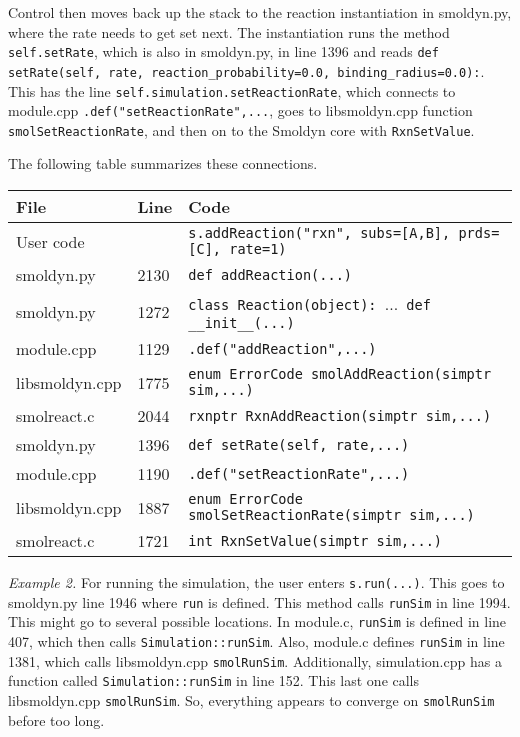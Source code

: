 \documentclass {scrbook}
\newcommand {\ttt} {\texttt}
\begin{document}
Control then moves back up the stack to the reaction instantiation in smoldyn.py, where the rate needs to get set next. The instantiation runs the method \ttt{self.setRate}, which is also in smoldyn.py, in line 1396 and reads \ttt{def setRate(self, rate, reaction\_probability=0.0, binding\_radius=0.0):}. This has the line \ttt{self.simulation.setReactionRate}, which connects to module.cpp \ttt{.def("setReactionRate",...}, goes to libsmoldyn.cpp function \ttt{smolSetReactionRate}, and then on to the Smoldyn core with \ttt{RxnSetValue}.

The following table summarizes these connections.

\begin{longtable}[c]{lll}
File & Line & Code \\
\hline
User code & &\ttt{s.addReaction("rxn", subs=[A,B], prds=[C], rate=1)} \\
smoldyn.py & 2130 & \hspace{0.2cm} \ttt{def addReaction(...)} \\
smoldyn.py & 1272 & \hspace{0.4cm} \ttt{class Reaction(object): }...\ttt{ def \_\_init\_\_(...)} \\
module.cpp & 1129 & \hspace{0.6cm} \ttt{.def("addReaction",...)} \\
libsmoldyn.cpp & 1775 & \hspace{0.8cm} \ttt{enum ErrorCode smolAddReaction(simptr sim,...)} \\
smolreact.c & 2044 & \hspace{1cm} \ttt{rxnptr RxnAddReaction(simptr sim,...)} \\
smoldyn.py & 1396 & \hspace{0.6cm} \ttt{def setRate(self, rate,...)} \\
module.cpp & 1190 & \hspace{0.8cm} \ttt{.def("setReactionRate",...)} \\
libsmoldyn.cpp & 1887 & \hspace{1cm} \ttt{enum ErrorCode smolSetReactionRate(simptr sim,...)} \\
smolreact.c & 1721 & \hspace{1.2cm} \ttt{int RxnSetValue(simptr sim,...)}
\end{longtable}

\textit{Example 2.} For running the simulation, the user enters \ttt{s.run(...)}. This goes to smoldyn.py line 1946 where \ttt{run} is defined. This method calls \ttt{runSim} in line 1994. This might go to several possible locations. In module.c, \ttt{runSim} is defined in line 407, which then calls \ttt{Simulation::runSim}. Also, module.c defines \ttt{runSim} in line 1381, which calls libsmoldyn.cpp \ttt{smolRunSim}. Additionally, simulation.cpp has a function called \ttt{Simulation::runSim} in line 152. This last one calls libsmoldyn.cpp \ttt{smolRunSim}. So, everything appears to converge on \ttt{smolRunSim} before too long.
\end{document}

